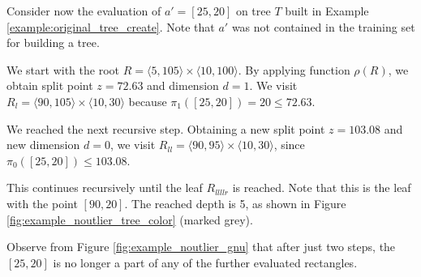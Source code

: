 \begin{example}
\label{ex:novelty_point_evaluation_original}
    Consider now the evaluation of $a' = [25,20]$ on tree $T$ built in Example \ref{example:original_tree_create}. Note that $a'$ was not contained in the training set for building a tree.

    We start with the root $R = \langle 5,105\rangle \times \langle 10, 100 \rangle$.
    By applying function $\rho(R)$, we obtain split point $z = 72.63$ and dimension $d = 1$.
We visit $R_l = \langle 90,105\rangle \times \langle 10, 30 \rangle$ 
because $\pi_1([25,20]) = 20 \le 72.63.$

We reached the next recursive step. Obtaining a new split point $z = 103.08$ and new dimension $d = 0$, we visit $R_{ll} = \langle 90,95\rangle \times \langle 10, 30 \rangle$, since $\pi_0([25,20]) \le 103.08$.


This continues recursively until the leaf $R_{llllr}$ is reached. Note that this is the leaf with the point $[90,20]$. The reached depth is 5, as shown in Figure \ref{fig:example_noutlier_tree_color} (marked grey).


Observe from Figure \ref{fig:example_noutlier_gnu} that after just two steps, the $[25,20]$ is no longer a part of any of the further evaluated rectangles.


\end{example}



